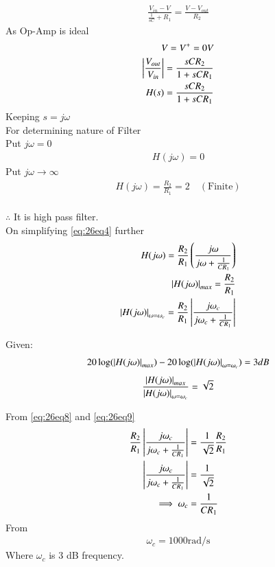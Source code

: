\documentclass[journal,12pt,twocolumn]{IEEEtran}
\theoremstyle{remark}
\begin{document}
\begin{align}
\frac{V_{in}-V}{\frac{1}{sC}+R_1}=\frac{V-V_{out}}{R_2}
\end{align}
As Op-Amp is ideal
\begin{align}
V=V^+=0V\\
\left\vert\frac{V_{out}}{V_{in}}\right\vert=\frac{sCR_2}{1+sCR_1}\\
H(s)=\frac{sCR_2}{1+sCR_1}
\label{eq:26eq4}
\end{align}
Keeping $s=j\omega$\\
For determining nature of Filter\\
Put $j\omega=0$
\begin{align}
H(j\omega)=0
\end{align}
Put $j\omega\rightarrow \infty$
\begin{align}
H(j\omega)=\frac{R_2}{R_1}=2\quad (\text{Finite})
\end{align}\\
$\therefore$ It is high pass filter.\\

On simplifying \eqref{eq:26eq4} further
\begin{align}
H(j\omega)=\frac{R_2}{R_1}\left(\frac{j\omega}{j\omega+\frac{1}{CR_1}}\right)\\
\left\vert H(j\omega)\right\vert_{max}=\frac{R_2}{R_1} \label{eq:26eq8}\\
\left\vert H(j\omega)\right\vert_{\omega=\omega_c}=\frac{R_2}{R_1}\left\vert\frac{j\omega_c}{j\omega_c+\frac{1}{CR_1}}\right\vert
\label{eq:26eq9}
\end{align}

Given: 
\begin{align}
20\log(\left\vert H(j\omega)\right\vert_{max})-20\log(\left\vert H(j\omega)\right\vert_{\omega=\omega_c})=3 dB
\end{align}
\begin{align}
\frac{\left\vert H(j\omega)\right\vert_{max}}{\left\vert H(j\omega)\right\vert_{\omega=\omega_c}}=\sqrt 2
\end{align}
 
From \eqref{eq:26eq8} and \eqref{eq:26eq9}
\begin{align}
\frac{R_2}{R_1}\left\vert\frac{j\omega_c}{j\omega_c+\frac{1}{CR_1}}\right\vert&=\frac{1}{\sqrt 2}\frac{R_2}{R_1}\\
\left\vert\frac{j\omega_c}{j\omega_c+\frac{1}{CR_1}}\right\vert&=\frac{1}{\sqrt 2}\\
\implies \omega_c &= \frac{1}{CR_1}
\end{align}
From 
\begin{align}
\omega_c= 1000 \text{rad/s}
\end{align}
Where $\omega_c$ is 3 dB frequency.\\
\end{document}
